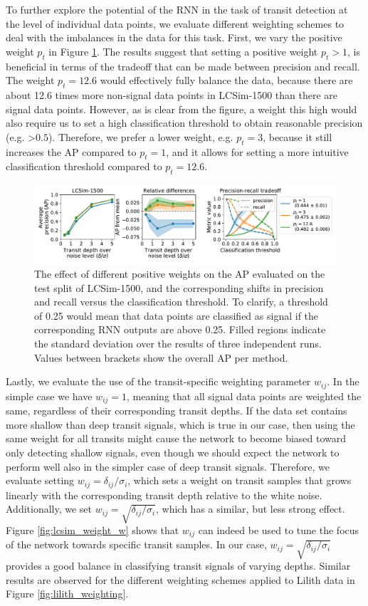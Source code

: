 To further explore the potential of the RNN in the task of transit detection at the level of individual data points, we evaluate different weighting schemes to deal with the imbalances in the data for this task. First, we vary the positive weight $p_t$ in Figure \ref{fig:lcsim_weight_p}. The results suggest that setting a positive weight $p_t > 1$, is beneficial in terms of the tradeoff that can be made between precision and recall. The weight $p_t=12.6$ would effectively fully balance the data, because there are about 12.6 times more non-signal data points in LCSim-1500 than there are signal data points. However, as is clear from the figure, a weight this high would also require us to set a high classification threshold to obtain reasonable precision (e.g. >$0.5$). Therefore, we prefer a lower weight, e.g. $p_t = 3$, because it still increases the AP compared to $p_t = 1$, and it allows for setting a more intuitive classification threshold compared to $p_t = 12.6$.
\begin{figure}
    \centering
    \includegraphics[width=0.95\linewidth]{Experiments/Figures/Models/lcsim1500_AP_weighting-p.pdf}
    \caption{The effect of different positive weights on the AP evaluated on the test split of LCSim-1500, and the corresponding shifts in precision and recall versus the classification threshold. To clarify, a threshold of 0.25 would mean that data points are classified as signal if the corresponding RNN outputs are above 0.25. Filled regions indicate the standard deviation over the results of three independent runs. Values between brackets show the overall AP per method.}
    \label{fig:lcsim_weight_p}
\end{figure}

Lastly, we evaluate the use of the transit-specific weighting parameter $w_{ij}$. In the simple case we have $w_{ij} = 1$, meaning that all signal data points are weighted the same, regardless of their corresponding transit depths. If the data set contains more shallow than deep transit signals, which is true in our case, then using the same weight for all transits might cause the network to become biased toward only detecting shallow signals, even though we should expect the network to perform well also in the simpler case of deep transit signals. Therefore, we evaluate setting $w_{ij} = \delta_{ij}/\sigma_i$, which sets a weight on transit samples that grows linearly with the corresponding transit depth relative to the white noise. Additionally, we set $w_{ij} = \sqrt{\delta_{ij}/\sigma_i}$, which has a similar, but less strong effect. Figure \ref{fig:lcsim_weight_w} shows that $w_{ij}$ can indeed be used to tune the focus of the network towards specific transit samples. In our case, $w_{ij} = \sqrt{\delta_{ij}/\sigma_i}$ provides a good balance in classifying transit signals of varying depths. Similar results are observed for the different weighting schemes applied to Lilith data in Figure \ref{fig:lilith_weighting}.

